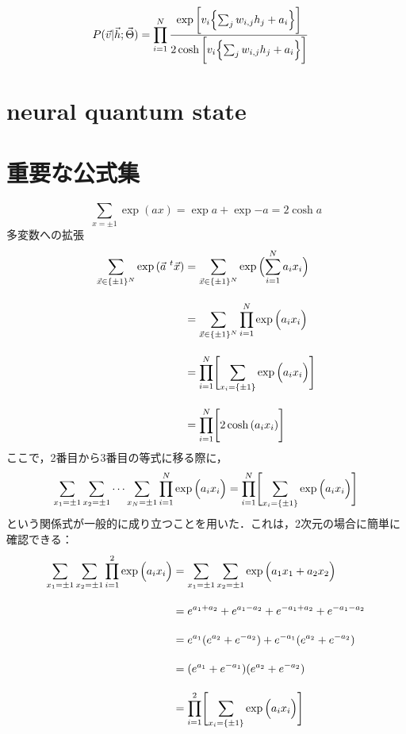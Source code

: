 \begin{align}
    P(\vec{v}|\vec{h};\vec{\Theta}) 
    &=\prod_{i=1}^{N}
    \frac{\exp{\biggl[v_i\Bigl\{\sum_{j}w_{i,j}  h_j  + a_{i}\Bigr\}
    \biggr]}}
    {
    2\cosh{\biggl[v_i\Bigl\{\sum_{j}w_{i,j}  h_j  + a_{i}\Bigr\}
    \biggr]}}
\end{align}




\section{neural quantum state}

\section{重要な公式集}
\begin{equation}
    \sum_{x=\pm1}\exp{(ax)}=\exp{a}+\exp{-a} = 2\cosh{a}
\end{equation}
多変数への拡張
\begin{align}
    \sum_{\vec{x}\in\{\pm1\}^{N}}\exp{(\vec{a}^{\ t}\vec{x})}
    &=\sum_{\vec{x}\in\{\pm1\}^{N}}\exp{\Bigl(\sum_{i=1}^N a_ix_i\Bigr)}\nn[10pt]
    &=\sum_{\vec{x}\in\{\pm1\}^{N}}\prod_{i=1}^N\exp{\Bigl( a_ix_i\Bigr)}\nn[10pt]
    &=\prod_{i=1}^N\Biggl[
    \sum_{x_i=\{\pm1\}}\exp{\Bigl( a_ix_i\Bigr)}
    \Biggr]\nn[10pt]
    &=\prod_{i=1}^N\Biggl[
    2\cosh{(a_ix_i)}
    \Biggr]
\end{align}
ここで，2番目から3番目の等式に移る際に，
\begin{equation}
    \sum_{x_1=\pm1}\sum_{x_2=\pm1}\cdots\sum_{x_N=\pm1}
    \prod_{i=1}^N\exp{\Bigl( a_ix_i\Bigr)}\nn[10pt]
    =\prod_{i=1}^N\Biggl[
    \sum_{x_i=\{\pm1\}}\exp{\Bigl( a_ix_i\Bigr)}
    \Biggr]
\end{equation}
という関係式が一般的に成り立つことを用いた．これは，2次元の場合に簡単に確認できる：
\begin{align}
    \sum_{x_1=\pm1}\sum_{x_2=\pm1}
    \prod_{i=1}^2\exp{\Bigl( a_ix_i\Bigr)}
    &=\sum_{x_1=\pm1}\sum_{x_2=\pm1}
    \exp{\Bigl( a_1 x_1 + a_2 x_2\Bigr)}\nn[10pt]
    &=
    e^{a_1 + a_2}
    +e^{a_1  - a_2 }
    +e^{- a_1  + a_2 }
    +e^{- a_1 - a_2}\nn[10pt]
    &=
    e^{a_1}
    (e^{a_2}+e^{ - a_2 })
    +e^{- a_1 }
    (e^{a_2}+e^{ - a_2 })\nn[10pt]
    &=
    (e^{a_1}+e^{- a_1 })
    (e^{a_2}+e^{ - a_2 })\nn[10pt]
    &=\prod_{i=1}^2\Biggl[
    \sum_{x_i=\{\pm1\}}\exp{\Bigl( a_ix_i\Bigr)}
    \Biggr]
\end{align}
